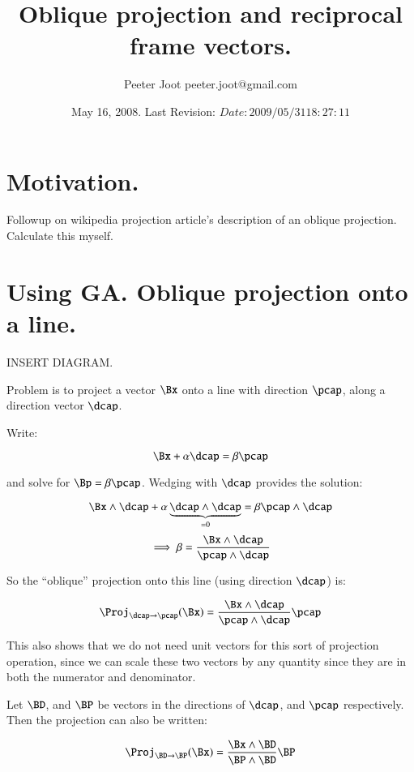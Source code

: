 \documentclass{article}      %
\title{ Oblique projection and reciprocal frame vectors. }
\author{Peeter Joot \quad peeter.joot@gmail.com}         %
\date{ May 16, 2008.  Last Revision: $Date: 2009/05/31 18:27:11 $ }
\begin{document}

\maketitle{}

\tableofcontents

\section{ Motivation. }

Followup on wikipedia projection article's description of an oblique
projection.  Calculate this myself.

\section{ Using GA.  Oblique projection onto a line. }

INSERT DIAGRAM.

Problem is to project a vector $\Bx$ onto a line with direction $\pcap$, along a direction vector $\dcap$.

Write:

\begin{equation}\label{eqn:solveForprojLineUnit}
\Bx + \alpha \dcap = \beta \pcap
\end{equation}

and solve for $\Bp = \beta \pcap$.  Wedging with $\dcap$ provides the solution:

\[
\Bx \wedge \dcap + \alpha \underbrace{\dcap \wedge \dcap}_{=0} = \beta \pcap \wedge \dcap
\]
\[
\implies
\beta = \frac{\Bx \wedge \dcap}{\pcap \wedge \dcap}
\]

So the ``oblique'' projection onto this line (using direction $\dcap$) is:

\begin{equation}
\Proj_{\dcap \rightarrow \pcap}(\Bx) =
\frac{\Bx \wedge \dcap}{\pcap \wedge \dcap} \pcap
\end{equation}

This also shows that we do not need unit vectors for this sort of projection
operation, since we can scale these two vectors by any quantity since they are
in both the numerator and denominator.

Let $\BD$, and $\BP$ be vectors in the directions of $\dcap$, and $\pcap$ respectively.  Then the projection can also be written:

\begin{equation}\label{eqn:obliqueGAproj}
\Proj_{\BD \rightarrow \BP}(\Bx) =
\frac{\Bx \wedge \BD}{\BP \wedge \BD} \BP
\end{equation}
\end{document}
